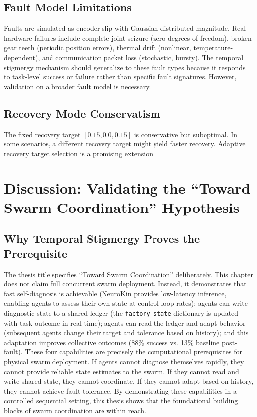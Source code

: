 \documentclass[12pt,a4paper,oneside]{report}
\begin{document}
\subsection{Fault Model Limitations}

Faults are simulated as encoder slip with Gaussian-distributed magnitude. Real hardware failures include complete joint seizure (zero degrees of freedom), broken gear teeth (periodic position errors), thermal drift (nonlinear, temperature-dependent), and communication packet loss (stochastic, bursty). The temporal stigmergy mechanism should generalize to these fault types because it responds to task-level success or failure rather than specific fault signatures. However, validation on a broader fault model is necessary.

\subsection{Recovery Mode Conservatism}

The fixed recovery target $[0.15, 0.0, 0.15]$ is conservative but suboptimal. In some scenarios, a different recovery target might yield faster recovery. Adaptive recovery target selection is a promising extension.

\section{Discussion: Validating the ``Toward Swarm Coordination'' Hypothesis}

\subsection{Why Temporal Stigmergy Proves the Prerequisite}

The thesis title specifies ``Toward Swarm Coordination'' deliberately. This chapter does not claim full concurrent swarm deployment. Instead, it demonstrates that fast self-diagnosis is achievable (NeuroKin provides low-latency inference, enabling agents to assess their own state at control-loop rates); agents can write diagnostic state to a shared ledger (the \texttt{factory\_state} dictionary is updated with task outcome in real time); agents can read the ledger and adapt behavior (subsequent agents change their target and tolerance based on history); and this adaptation improves collective outcomes (88\% success vs. 13\% baseline post-fault). These four capabilities are precisely the computational prerequisites for physical swarm deployment. If agents cannot diagnose themselves rapidly, they cannot provide reliable state estimates to the swarm. If they cannot read and write shared state, they cannot coordinate. If they cannot adapt based on history, they cannot achieve fault tolerance. By demonstrating these capabilities in a controlled sequential setting, this thesis shows that the foundational building blocks of swarm coordination are within reach.
\end{document}
